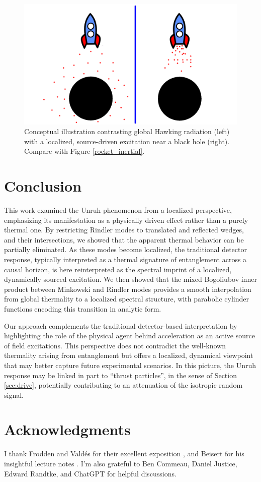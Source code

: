 \documentclass[12pt,a4paper]{article}
\begin{document}
\begin{figure}[h]
\centering
\includegraphics[scale=0.5]{rocket.png}
\caption{Conceptual illustration contrasting global Hawking radiation (left) with a localized, source-driven excitation near a black hole (right). Compare with Figure \ref{rocket_inertial}.}
\label{rocket}
\end{figure}

\section{Conclusion} \label{sec:conc}

This work examined the Unruh phenomenon from a localized perspective, emphasizing its manifestation as a physically driven effect rather than a purely thermal one. By restricting Rindler modes to translated and reflected wedges, and their intersections, we showed that the apparent thermal behavior can be partially eliminated. As these modes become localized, the traditional detector response, typically interpreted as a thermal signature of entanglement across a causal horizon, is here reinterpreted as the spectral imprint of a localized, dynamically sourced excitation. We then showed that the mixed Bogoliubov inner product between Minkowski and Rindler modes provides a smooth interpolation from global thermality to a localized spectral structure, with parabolic cylinder functions encoding this transition in analytic form.

Our approach complements the traditional detector-based interpretation by highlighting the role of the physical agent behind acceleration as an active source of field excitations. This perspective does not contradict the well-known thermality arising from entanglement but offers a localized, dynamical viewpoint that may better capture future experimental scenarios.  In this picture, the Unruh response may be linked in part to ``thrust particles'', in the sense of Section \ref{sec:drive}, potentially contributing to an attenuation of the isotropic random signal.


\section{Acknowledgments}
I thank Frodden and Valdés for their excellent exposition \cite{frodden2018unruh}, and Beisert for his insightful lecture notes \cite{beisert2012quantum}. I'm also grateful to Ben Commeau, Daniel Justice, Edward Randtke, and ChatGPT for helpful discussions.




\end{document}

